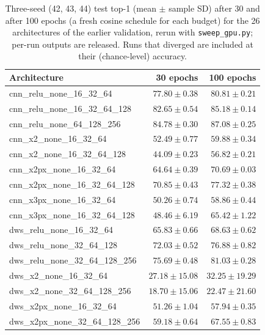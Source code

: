 \begin{table}[h]
\centering
\caption{Three-seed (42, 43, 44) test top-1 (mean $\pm$ sample SD) after 30 and after 100 epochs (a fresh cosine schedule for each budget) for the 26 architectures of the earlier validation, rerun with
  \texttt{sweep\_gpu.py}; per-run outputs are released.  Runs that diverged are included at their (chance-level) accuracy.}
\label{tab:robustness}
\scriptsize
\begin{tabular}{lrr}
\toprule
\textbf{Architecture} & \textbf{30 epochs} & \textbf{100 epochs} \\
\midrule
cnn\_relu\_none\_16\_32\_64 & $77.80\mathbin{\pm}0.38$ & $80.81\mathbin{\pm}0.21$ \\
cnn\_relu\_none\_16\_32\_64\_128 & $82.65\mathbin{\pm}0.54$ & $85.18\mathbin{\pm}0.14$ \\
cnn\_relu\_none\_64\_128\_256 & $84.78\mathbin{\pm}0.30$ & $87.08\mathbin{\pm}0.25$ \\
cnn\_x2\_none\_16\_32\_64 & $52.49\mathbin{\pm}0.77$ & $59.88\mathbin{\pm}0.34$ \\
cnn\_x2\_none\_16\_32\_64\_128 & $44.09\mathbin{\pm}0.23$ & $56.82\mathbin{\pm}0.21$ \\
cnn\_x2px\_none\_16\_32\_64 & $64.64\mathbin{\pm}0.39$ & $70.69\mathbin{\pm}0.03$ \\
cnn\_x2px\_none\_16\_32\_64\_128 & $70.85\mathbin{\pm}0.43$ & $77.32\mathbin{\pm}0.38$ \\
cnn\_x3px\_none\_16\_32\_64 & $50.26\mathbin{\pm}0.74$ & $58.86\mathbin{\pm}0.44$ \\
cnn\_x3px\_none\_16\_32\_64\_128 & $48.46\mathbin{\pm}6.19$ & $65.42\mathbin{\pm}1.22$ \\
dws\_relu\_none\_16\_32\_64 & $65.83\mathbin{\pm}0.66$ & $68.63\mathbin{\pm}0.62$ \\
dws\_relu\_none\_32\_64\_128 & $72.03\mathbin{\pm}0.52$ & $76.88\mathbin{\pm}0.82$ \\
dws\_relu\_none\_32\_64\_128\_256 & $75.69\mathbin{\pm}0.48$ & $81.03\mathbin{\pm}0.28$ \\
dws\_x2\_none\_16\_32\_64 & $27.18\mathbin{\pm}15.08$ & $32.25\mathbin{\pm}19.29$ \\
dws\_x2\_none\_32\_64\_128\_256 & $18.70\mathbin{\pm}15.06$ & $22.47\mathbin{\pm}21.60$ \\
dws\_x2px\_none\_16\_32\_64 & $51.26\mathbin{\pm}1.04$ & $57.94\mathbin{\pm}0.35$ \\
dws\_x2px\_none\_32\_64\_128\_256 & $59.18\mathbin{\pm}0.64$ & $67.55\mathbin{\pm}0.83$ \\

\end{tabular}
\end{table}
